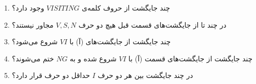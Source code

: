 \EXERCISE
\begin{enumerate}
\item
چند جایگشت از حروف کلمه‌ی
$VISITING$
وجود دارد؟
\item
در چند تا از جایگشت‌های قسمت قبل هیچ دو حرف
$V, S, N$
مجاور نیستند؟
\item
چند جایگشت از جایگشت‌های (آ) با
$VI$
شروع می‌شود؟
\item
چند جایگشت از جایگشت‌های قسمت (آ) با
$VI$
شروع شده و به
$NG$
ختم می‌شوند؟
\item
در چند جایگشت بین هر دو حرف
$I$
حداقل دو حرف قرار دارد؟
\end{enumerate}